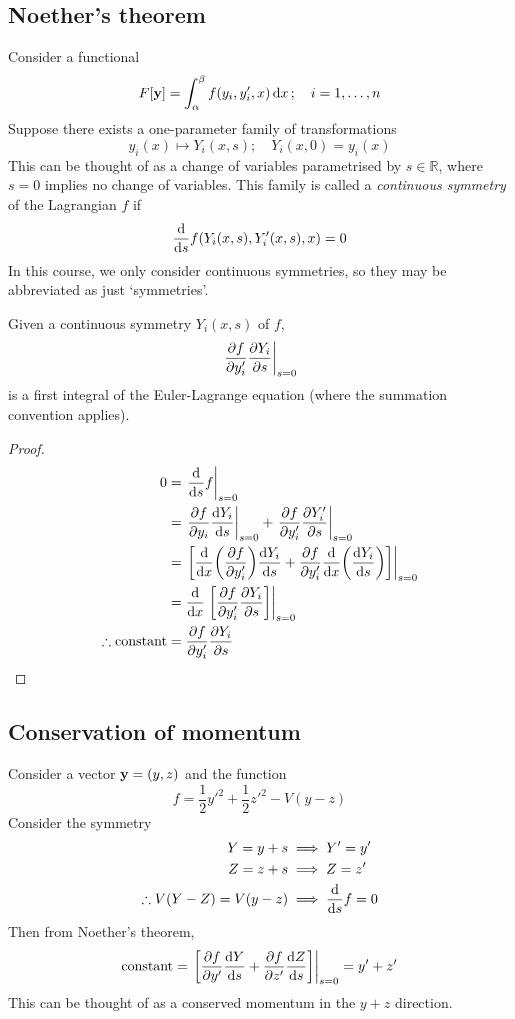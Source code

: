 \subsection{Noether's theorem}
Consider a functional
\[
	F[\vb y] = \int_\alpha^\beta f(y_i, y_i', x) \dd{x};\quad i = 1,\dots,n
\]
Suppose there exists a one-parameter family of transformations
\[
	y_i(x) \mapsto Y_i(x,s);\quad Y_i(x,0) = y_i(x)
\]
This can be thought of as a change of variables parametrised by \( s \in \mathbb R \), where \( s = 0 \) implies no change of variables.
This family is called a \textit{continuous symmetry} of the Lagrangian \( f \) if
\[
	\dv{s} f(Y_i(x,s), Y_i'(x,s), x) = 0
\]
In this course, we only consider continuous symmetries, so they may be abbreviated as just `symmetries'.
\begin{theorem}
	Given a continuous symmetry \( Y_i(x,s) \) of \( f \),
	\[
		\eval{\pdv{f}{y_i'}\pdv{Y_i}{s}}_{s=0}
	\]
	is a first integral of the Euler-Lagrange equation (where the summation convention applies).
\end{theorem}
\begin{proof}
	\begin{align*}
		0                          & = \eval{\dv{s} f}_{s=0}                                                                           \\
		                           & = \eval{\pdv{f}{y_i} \dv{Y_i}{s}}_{s=0} + \eval{\pdv{f}{y_i'}\pdv{Y_i'}{s}}_{s=0}                 \\
		                           & = \eval{\qty[\dv{x} \qty(\pdv{f}{y_i'})\dv{Y_i}{s} + \pdv{f}{y_i'}\dv{x}\qty(\dv{Y_i}{s})]}_{s=0} \\
		                           & = \dv{x}\eval{\qty[\pdv{f}{y_i'}\pdv{Y_i}{s}]}_{s=0}                                              \\
		\therefore \text{constant} & = \pdv{f}{y_i'}\pdv{Y_i}{s}
	\end{align*}
\end{proof}

\subsection{Conservation of momentum}
\begin{example}
	Consider a vector \( \vb y = (y,z) \) and the function
	\[
		f = \frac{1}{2}y'^2 + \frac{1}{2}z'^2 - V(y-z)
	\]
	Consider the symmetry
	\begin{align*}
		Y = y + s                  & \implies Y' = y'      \\
		Z = z + s                  & \implies Z = z'       \\
		\therefore V(Y-Z) = V(y-z) & \implies \dv{s} f = 0
	\end{align*}
	Then from Noether's theorem,
	\[
		\text{constant} = \eval{\qty[\pdv{f}{y'}\dv{Y}{s} + \pdv{f}{z'}\dv{Z}{s}]}_{s=0} = y' + z'
	\]
	This can be thought of as a conserved momentum in the \(y+z\) direction.
\end{example}

